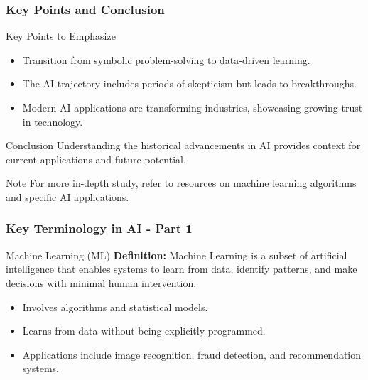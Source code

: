 \documentclass{beamer}
\begin{document}
\begin{frame}[fragile]
    \frametitle{Key Points and Conclusion}
    \begin{block}{Key Points to Emphasize}
        \begin{itemize}
            \item Transition from symbolic problem-solving to data-driven learning.
            \item The AI trajectory includes periods of skepticism but leads to breakthroughs.
            \item Modern AI applications are transforming industries, showcasing growing trust in technology.
        \end{itemize}
    \end{block}

    \begin{block}{Conclusion}
        Understanding the historical advancements in AI provides context for current applications and future potential.
    \end{block}

    \begin{block}{Note}
        For more in-depth study, refer to resources on machine learning algorithms and specific AI applications.
    \end{block}
\end{frame}

\begin{frame}[fragile]
    \frametitle{Key Terminology in AI - Part 1}
    \begin{block}{Machine Learning (ML)}
        \textbf{Definition:}  
        Machine Learning is a subset of artificial intelligence that enables systems to learn from data, identify patterns, and make decisions with minimal human intervention.
    \end{block}
    
    \begin{itemize}
        \item Involves algorithms and statistical models.
        \item Learns from data without being explicitly programmed.
        \item Applications include image recognition, fraud detection, and recommendation systems.
    \end{itemize}
\end{frame}
\end{document}
